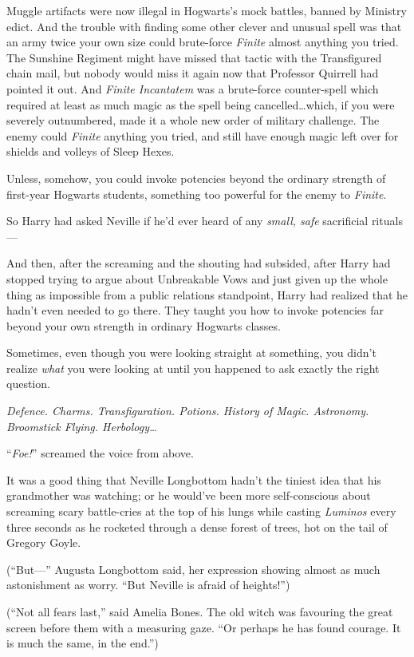 Muggle artifacts were now illegal in Hogwarts’s mock battles, banned by Ministry edict. And the trouble with finding some other clever and unusual spell was that an army twice your own size could brute-force \emph{Finite} almost anything you tried. The Sunshine Regiment might have missed that tactic with the Transfigured chain mail, but nobody would miss it again now that Professor Quirrell had pointed it out. And \emph{Finite Incantatem} was a brute-force counter-spell which required at least as much magic as the spell being cancelled…which, if you were severely outnumbered, made it a whole new order of military challenge. The enemy could \emph{Finite} anything you tried, and still have enough magic left over for shields and volleys of Sleep Hexes.

Unless, somehow, you could invoke potencies beyond the ordinary strength of first-year Hogwarts students, something too powerful for the enemy to \emph{Finite}.

So Harry had asked Neville if he’d ever heard of any \emph{small, safe} sacrificial rituals—

And then, after the screaming and the shouting had subsided, after Harry had stopped trying to argue about Unbreakable Vows and just given up the whole thing as impossible from a public relations standpoint, Harry had realized that he hadn’t even needed to go there. They taught you how to invoke potencies far beyond your own strength in ordinary Hogwarts classes.

Sometimes, even though you were looking straight at something, you didn’t realize \emph{what} you were looking at until you happened to ask exactly the right question.

\emph{Defence. Charms. Transfiguration. Potions. History of Magic. Astronomy. Broomstick Flying. Herbology…}

“\emph{Foe!}” screamed the voice from above.

\later

It was a good thing that Neville Longbottom hadn’t the tiniest idea that his grandmother was watching; or he would’ve been more self-conscious about screaming scary battle-cries at the top of his lungs while casting \emph{Luminos} every three seconds as he rocketed through a dense forest of trees, hot on the tail of Gregory Goyle.

(“But—” Augusta Longbottom said, her expression showing almost as much astonishment as worry. “But Neville is afraid of heights!”)

(“Not all fears last,” said Amelia Bones. The old witch was favouring the great screen before them with a measuring gaze. “Or perhaps he has found courage. It is much the same, in the end.”)

